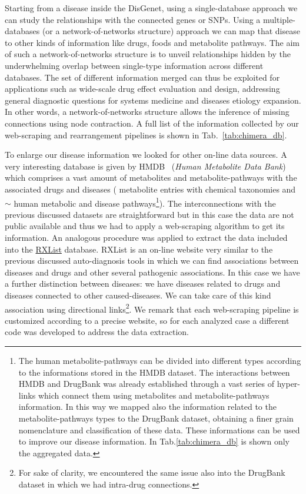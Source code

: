 \documentclass{standalone}
\begin{document}
Starting from a disease inside the DisGenet, using a single-database approach we can study the  relationships with the connected genes or SNPs.
Using a multiple-databases (or a network-of-networks structure) approach we can map that disease to other kinds of information like drugs, foods and metabolite pathways.
The aim of such a network-of-networks structure is to unveil relationships hidden by the underwhelming overlap between single-type information across different databases.
The set of different information merged can thus be exploited for applications such as wide-scale drug effect evaluation and design, addressing general diagnostic questions for systems medicine and diseases etiology expansion.
In other words, a network-of-networks structure allows the inference of missing connections using node contraction.
A full list of the information collected by our \textsf{web-scraping} and rearrangement pipelines is shown in Tab.~\ref{tab:chimera_db}.

To enlarge our disease information we looked for other on-line data sources.
A very interesting database is given by HMDB~\cite{HMDB} (\emph{Human Metabolite Data Bank}) which comprises a vast amount of metabolites and metabolite-pathways with the associated drugs and diseases ( metabolite entries with chemical taxonomies and $\sim$ human metabolic and disease pathways\footnote{
  The human metabolite-pathways can be divided into different types according to the informations stored in the HMDB dataset.
  The interactions between HMDB and DrugBank was already established through a vast series of hyper-links which connect them using metabolites and metabolite-pathways information.
  In this way we mapped also the information related to the metabolite-pathways types to the DrugBank dataset, obtaining a finer grain nomenclature and classification of these data.
  These informations can be used to improve our disease information.
  In Tab.\ref{tab:chimera_db} is shown only the aggregated data.
}).
The interconnections with the previous discussed datasets are straightforward but in this case the data are not public available and thus we had to apply a \textsf{web-scraping} algorithm to get its information.
An analogous procedure was applied to extract the data included into the \href{https://www.rxlist.com/script/main/hp.asp}{RXList} database.
RXList is an on-line website very similar to the previous discussed auto-diagnosis tools in which we can find associations between diseases and drugs and other several pathogenic associations.
In this case we have a further distinction between diseases: we have diseases related to drugs and diseases connected to other caused-diseases.
We can take care of this kind association using directional links\footnote{
  For sake of clarity, we encountered the same issue also into the DrugBank dataset in which we had intra-drug connections.
}.
We remark that each \textsf{web-scraping} pipeline is customized according to a precise website, so for each analyzed case a different code was developed to address the data extraction.
\end{document}
